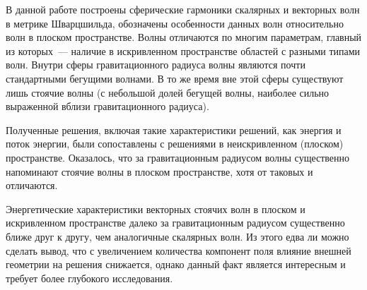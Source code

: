 \documentclass[\docroot/reports/draft/report.tex]{subfiles}
\begin{document}
\onlyinsubfile{\tableofcontents}

В данной работе построены сферические гармоники скалярных и векторных волн в метрике Шварцшильда, обозначены особенности данных волн относительно волн в плоском пространстве. Волны отличаются по многим параметрам, главный из которых~--- наличие в искривленном пространстве областей с разными типами волн. Внутри сферы гравитационного радиуса волны являются почти стандартными бегущими волнами. В то же время вне этой сферы существуют лишь стоячие волны (с небольшой долей бегущей волны, наиболее сильно выраженной вблизи гравитационного радиуса).

Полученные решения, включая такие характеристики решений, как энергия и поток энергии, были сопоставлены с решениями в неискривленном (плоском) пространстве. Оказалось, что за гравитационным радиусом волны существенно напоминают стоячие волны в плоском пространстве, хотя от таковых и отличаются.

Энергетические характеристики векторных стоячих волн в плоском и искривленном пространстве далеко за гравитационным радиусом существенно ближе друг к другу, чем аналогичные скалярных волн. Из этого едва ли можно сделать вывод, что с увеличением количества компонент поля влияние внешней геометрии на решения снижается, однако данный факт является интересным и требует более глубокого исследования.

\end{document}
